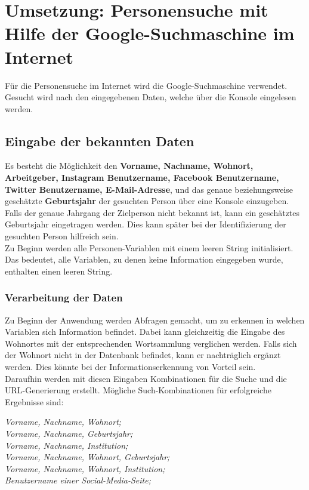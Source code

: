 \section{Umsetzung: Personensuche mit Hilfe der Google-Suchmaschine im Internet}
Für die Personensuche im Internet wird die Google-Suchmaschine verwendet. Gesucht wird nach den eingegebenen Daten, welche über die Konsole eingelesen werden.

	\subsection{Eingabe der bekannten Daten}
	Es besteht die Möglichkeit den \textbf{Vorname, Nachname, Wohnort, Arbeitgeber, Instagram Benutzername, Facebook Benutzername, Twitter Benutzername, E-Mail-Adresse}, und das genaue beziehungsweise geschätzte \textbf{Geburtsjahr} der gesuchten Person über eine Konsole einzugeben. Falls der genaue Jahrgang der Zielperson nicht bekannt ist, kann ein geschätztes Geburtsjahr eingetragen werden. Dies kann später bei der Identifizierung der gesuchten Person hilfreich sein.\\
	Zu Beginn werden alle Personen-Variablen mit einem leeren String initialisiert. Das bedeutet, alle Variablen, zu denen keine Information eingegeben wurde, enthalten einen leeren String.
	
		\subsubsection{Verarbeitung der Daten}
		Zu Beginn der Anwendung werden Abfragen gemacht, um zu erkennen in welchen Variablen sich Information befindet. Dabei kann gleichzeitig die Eingabe des Wohnortes mit der entsprechenden Wortsammlung verglichen werden. Falls sich der Wohnort nicht in der Datenbank befindet, kann er nachträglich ergänzt werden. Dies könnte bei der Informationserkennung von Vorteil sein.\\
		Daraufhin werden mit diesen Eingaben Kombinationen für die Suche und die URL-Generierung erstellt. Mögliche Such-Kombinationen für erfolgreiche Ergebnisse sind:
		
		\textit{Vorname, Nachname, Wohnort;}\\
		\textit{Vorname, Nachname, Geburtsjahr;}\\
		\textit{Vorname, Nachname, Institution;}\\
		\textit{Vorname, Nachname, Wohnort, Geburtsjahr;}\\
		\textit{Vorname, Nachname, Wohnort, Institution;}\\
		\textit{Benutzername einer Social-Media-Seite;}
		
